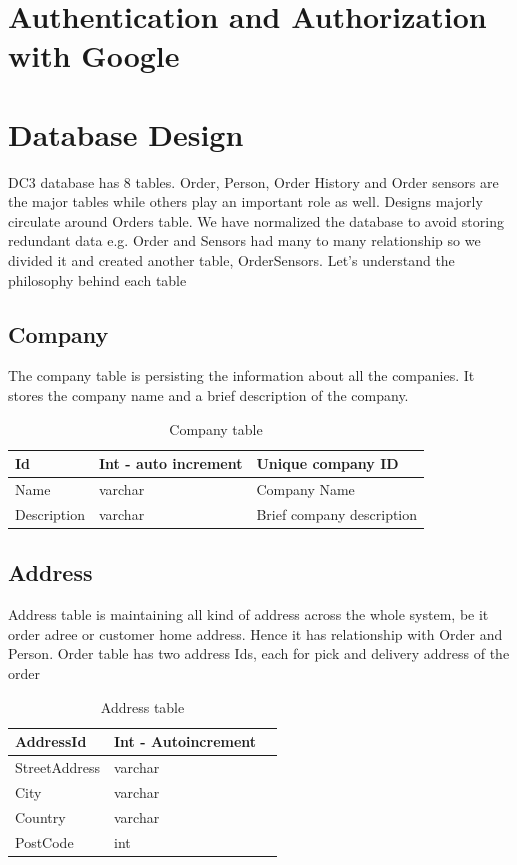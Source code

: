 \section{Authentication and Authorization with Google}


\section{Database Design}
DC3 database has 8 tables. Order, Person, Order History and Order sensors are the major tables while others play an important role as well.  Designs majorly circulate around Orders table. We have normalized the database to avoid storing redundant data e.g. Order and Sensors had many to many relationship so we divided it and created another table, OrderSensors. Let’s understand the philosophy behind each table


\subsection{Company}
The company table is persisting the information about all the companies. It stores the company name and a brief description of the company. 

\begin{table}[!ht]
	\centering
	\begin{tabular}{ |l|l|l| }
		\hline
		Id & Int - auto increment & Unique company ID \\
		\hline
		Name & varchar & Company Name \\
		\hline
		Description & varchar & Brief company description \\
		\hline
	\end{tabular}
	\caption{Company table}
\end{table}



\subsection{Address}
Address table is maintaining all kind of address across the whole system, be it order adree or customer home address. Hence it has relationship with Order and Person. Order table has two address Ids, each for pick and delivery address of the order



\begin{table}[!ht]
	\centering
	\begin{tabular}{ |l|l|l| }
		\hline
		AddressId  & Int - Autoincrement & \\
		\hline
		StreetAddress  & varchar & \\
		\hline
		City  & varchar &\\
		\hline
		Country  & varchar &\\
		\hline
		PostCode  & int &\\
		\hline
	\end{tabular}
	\caption{Address table}
\end{table}



